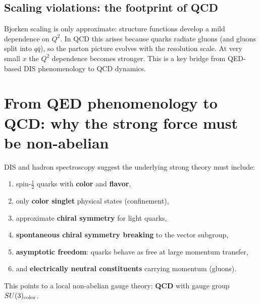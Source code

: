 \subsection{Scaling violations: the footprint of QCD}
Bjorken scaling is only approximate: structure functions develop a mild dependence on $Q^2$.
In QCD this arises because quarks radiate gluons (and gluons split into $q\bar q$),
so the parton picture evolves with the resolution scale. At very small $x$ the $Q^2$ dependence
becomes stronger. This is a key bridge from QED-based DIS phenomenology to QCD dynamics.

\section{From QED phenomenology to QCD: why the strong force must be non-abelian}
DIS and hadron spectroscopy suggest the underlying strong theory must include:
\begin{enumerate}
  \item spin-$\tfrac12$ quarks with \textbf{color} and \textbf{flavor},
  \item only \textbf{color singlet} physical states (confinement),
  \item approximate \textbf{chiral symmetry} for light quarks,
  \item \textbf{spontaneous chiral symmetry breaking} to the vector subgroup,
  \item \textbf{asymptotic freedom}: quarks behave as free at large momentum transfer,
  \item and \textbf{electrically neutral constituents} carrying momentum (gluons).
\end{enumerate}
This points to a local non-abelian gauge theory: \textbf{QCD} with gauge group $SU(3)_{\rm color}$.


